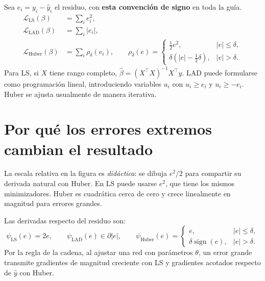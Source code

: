 \documentclass[11pt,a4paper]{article}
\newcommand{\loss}{\mathcal L}
\begin{document}
Sea \(e_i=y_i-\widehat y_i\) el residuo, con \textbf{esta convención de signo} en toda la guía.
\[
\begin{aligned}
 \loss_{\mathrm{LS}}(\beta)&=\sum_i e_i^2,\\
 \loss_{\mathrm{LAD}}(\beta)&=\sum_i |e_i|,\\
 \loss_{\mathrm{Huber}}(\beta)&=\sum_i\rho_\delta(e_i),\qquad
\rho_\delta(e)=
\begin{cases}\tfrac12e^2,&|e|\leq\delta,\\
\delta(|e|-\tfrac12\delta),&|e|>\delta.
\end{cases}
\end{aligned}
\]
Para LS, si \(X\) tiene rango completo, \(\widehat\beta=(X^\top X)^{-1}X^\top y\). LAD puede formularse como programación lineal, introduciendo variables \(u_i\) con \(u_i\ge e_i\) y \(u_i\ge-e_i\). Huber se ajusta usualmente de manera iterativa.

\section{Por qué los errores extremos cambian el resultado}

\begin{center}
\end{center}

La escala relativa en la figura es \emph{didáctica}: se dibuja \(e^2/2\) para compartir su derivada natural con Huber. En LS puede usarse \(e^2\), que tiene los mismos minimizadores. Huber es cuadrática cerca de cero y crece linealmente en magnitud para errores grandes.

Las derivadas respecto del residuo son:
\[
 \psi_{\mathrm{LS}}(e)=2e,\qquad
 \psi_{\mathrm{LAD}}(e)\in\partial|e|,\qquad
 \psi_{\mathrm{Huber}}(e)=
 \begin{cases} e,&|e|\le\delta,\\
 \delta\operatorname{sign}(e),&|e|>\delta.
 \end{cases}
\]
Por la regla de la cadena, al ajustar una red con parámetros \(\theta\), un error grande transmite gradientes de magnitud creciente con LS y gradientes acotados respecto de \(\widehat y\) con Huber.
\end{document}
